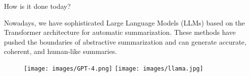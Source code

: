 \begin{frame}{How is it done today?}

  Nowadays, we have sophisticated Large Language Models (LLMs) based on the Transformer architecture \citep{vaswani2017attention} for automatic summarization.
  These methods have pushed the boundaries of abstractive summarization and can generate accurate, coherent, and human-like summaries.

  \vskip 1.3cm

  \begin{figure}
    \centering
    \texttt{[image: images/GPT-4.png]}
    \hskip 1cm
    \texttt{[image: images/llama.jpg]}
  \end{figure}

\end{frame}
